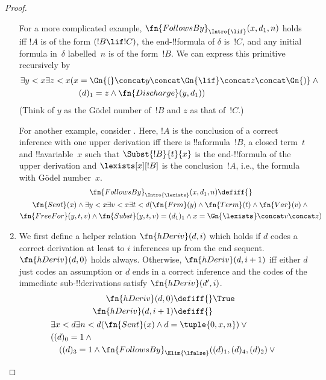 \documentclass[../../../include/open-logic-section]{subfiles}
\begin{document}
\begin{proof}
\begin{enumerate}
  For a more complicated example, $\fn{FollowsBy}_{\Intro{\lif}}(x, d_1,
    n)$ holds iff $!A$ is of the form $(!B \lif !C)$, the
  end-!!{formula} of $\delta$ is~$!C$, and any initial formula
  in~$\delta$ labelled~$n$ is of the form~$!B$.  We can express this
  primitive recursively by
  \begin{align*}
  \exists y<x\exists z<x &(x = \Gn{(} \concat y \concat \Gn{\lif}
  \concat z\concat \Gn{)} \land {} \\
  & \quad(d)_1 = z \land \fn{Discharge}(y, d_1))
  \end{align*}
  (Think of $y$ as the G\"odel number of~$!B$ and $z$ as that
  of~$!C$.)

  For another example, consider \Intro{\lexists}.  Here, $!A$ is the
  conclusion of a correct inference with one upper derivation iff
  there is !!a{formula}~$!B$, a closed term~$t$ and
  !!a{variable}~$x$ such that $\Subst{!B}{t}{x}$ is the
  end-!!{formula} of the upper derivation and $\lexists[x][!B]$
  is the conclusion~$!A$, i.e., the formula with G\"odel number~$x$.
\begin{multline*}
\fn{FollowsBy}_{\Intro{\lexists}}(x, d_1, n) \defiff {} \\
\fn{Sent}(x) \land \exists y < x\exists v<x\exists t<d
(\fn{Frm}(y) \land \fn{Term}(t) \land \fn{Var}(v)  \land {}\\
\fn{FreeFor}(y, t, v) \land \fn{Subst}(y,t,v) = (d_1)_1 \land
x = \Gn{\lexists} \concat v \concat z)
\end{multline*}
\item We first define a helper relation $\fn{hDeriv}(d, i)$ which
  holds if $d$ codes a correct derivation at least to $i$ inferences
  up from the end sequent.  $\fn{hDeriv}(d, 0)$ holds always.
  Otherwise, $\fn{hDeriv}(d, i+1)$ iff either $d$ just codes an
  assumption or $d$ ends in a correct inference and the codes of the
  immediate sub-!!{derivation}s satisfy $\fn{hDeriv}(d', i)$.
\begin{multline*}
  \begin{aligned}
\fn{hDeriv}(d, 0) \defiff {} & \True \\
\fn{hDeriv}(d, i+1) \defiff {} &
  \end{aligned}\\
  \begin{aligned}
& \exists x<d\exists n<d(\fn{Sent}(x) \land d = \tuple{0, x, n}) \lor {}\\
& ((d)_0 = 1 \land {}\\
& \quad ((d)_3 = 1 \land
\fn{FollowsBy}_{\Elim{\lfalse}}((d)_1, (d)_4, (d)_2) \lor{}\\

\end{aligned}
\end{multline*}
\end{enumerate}
\end{proof}
\end{document}
